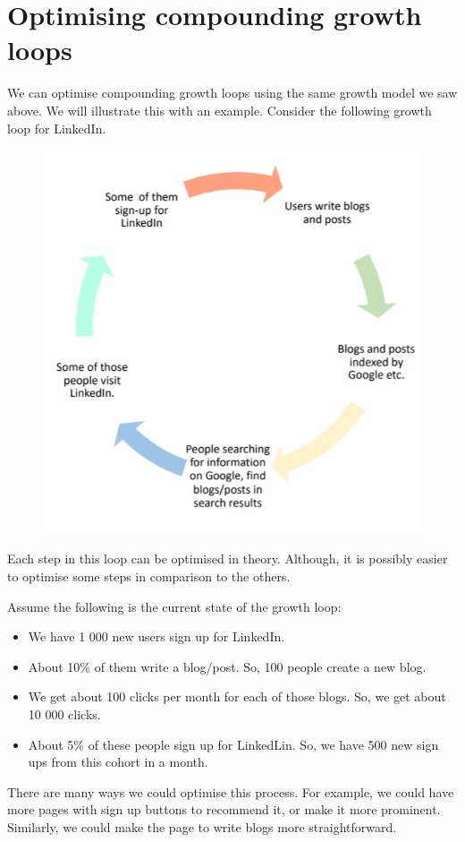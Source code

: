 \documentclass[a4paper, openany]{memoir}
\begin{document}
\section{Optimising compounding growth loops}
We can optimise compounding growth loops using the same growth model we saw above. We will illustrate this with an example. Consider the following growth loop for LinkedIn.
\begin{figure}[H]
    \centering
    \includegraphics[scale=0.6]{src/18.18 LinkedIn growth loop 3.PNG}
\end{figure}
\noindent Each step in this loop can be optimised in theory. Although, it is possibly easier to optimise some steps in comparison to the others.

Assume the following is the current state of the growth loop:
\begin{itemize}
    \item We have 1 000 new users sign up for LinkedIn.
    \item About 10\% of them write a blog/post. So, 100 people create a new blog.
    \item We get about 100 clicks per month for each of those blogs. So, we get about 10 000 clicks.
    \item About 5\% of these people sign up for LinkedLin. So, we have 500 new sign ups from this cohort in a month.
\end{itemize}
There are many ways we could optimise this process. For example, we could have more pages with sign up buttons to recommend it, or make it more prominent. Similarly, we could make the page to write blogs more straightforward.
\end{document}
